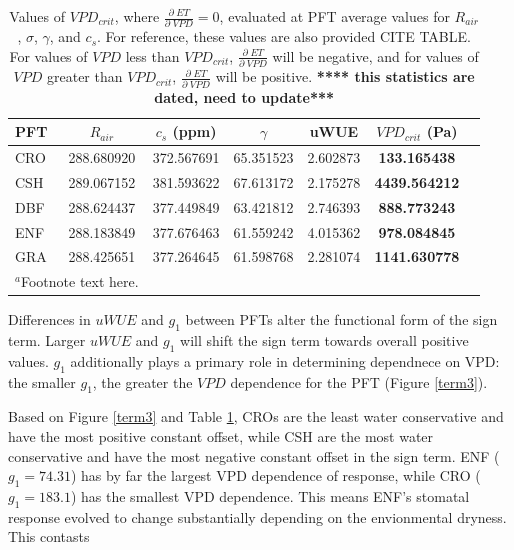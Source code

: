 \documentclass[draft,linenumbers]{agujournal}
\begin{document}
\begin{table}
  \label{vpd_crit}
\caption{Values of $VPD_{crit}$, where $\frac{\partial \; ET}{\partial \; VPD} = 0$, evaluated at PFT average values for $R_{air}$, $\sigma$, $\gamma$, and $c_s$. For reference, these values are also provided CITE TABLE. For values of $VPD$ less than $VPD_{crit}$, $\frac{\partial \; ET}{\partial \; VPD}$ will be negative, and for values of $VPD$ greater than $VPD_{crit}$, $\frac{\partial \; ET}{\partial \; VPD}$ will be positive. \textbf{**** this statistics are dated, need to update***}}
\centering
\begin{tabular}{l c c c c c c}
  \hline
  PFT & $R_{air}$ & $c_s$ (ppm) & $\gamma$ &  uWUE    & \textbf{$VPD_{crit}$ (Pa)} \\
  \hline
  CRO &  288.680920 & 372.567691& 65.351523& 2.602873&  \textbf{133.165438} \\
  CSH &   289.067152& 381.593622& 67.613172& 2.175278& \textbf{4439.564212} \\
  DBF &   288.624437& 377.449849& 63.421812& 2.746393&  \textbf{888.773243} \\
  ENF &  288.183849& 377.676463& 61.559242& 4.015362&  \textbf{978.084845} \\
  GRA &  288.425651& 377.264645& 61.598768& 2.281074& \textbf{1141.630778} \\
\hline
\multicolumn{2}{l}{$^{a}$Footnote text here.}
\end{tabular}
\end{table}

Differences in $uWUE$ and $g_1$ between PFTs alter the functional form of the sign term.  Larger $uWUE$ and $g_1$ will shift the sign term towards overall positive values. $g_1$ additionally plays a primary role in determining dependnece on VPD: the smaller $g_1$, the greater the $VPD$ dependence for the PFT (Figure \ref{term3}).

Based on Figure \ref{term3} and Table \ref{vpd_crit}, CROs are the least water conservative and have the most positive constant offset, while CSH are the most water conservative and have the most negative constant offset in the sign term.  ENF ($g_1 = 74.31$) has by far the largest VPD dependence of response, while CRO ($g_1 = 183.1$) has the smallest VPD dependence. This means ENF's stomatal response evolved to change substantially depending on the envionmental dryness. This contasts
 
\end{document}
